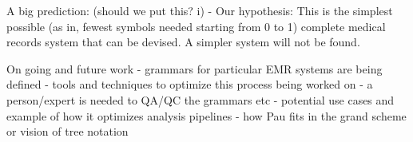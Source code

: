 \documentclass[journal]{IEEEtran}
\begin{document}
A big prediction: (should we put this? i)
 - Our hypothesis: This is the simplest possible (as in, fewest symbols needed starting from 0 to 1) complete medical records system that can be devised. A simpler system will not be found.

On going and future work
	- grammars for particular EMR systems are being defined
		- tools and techniques to optimize this process being worked on
		- a person/expert is needed to QA/QC the grammars etc
	- potential use cases and example of how it optimizes analysis pipelines
	- how Pau fits in the grand scheme or vision of tree notation
\fi


%
%
%
%
%



%
\end{document}

